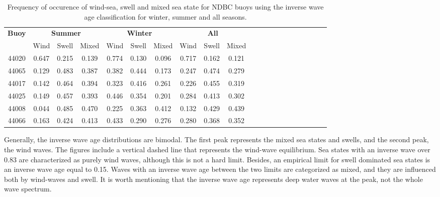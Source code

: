 \begin{table}[H]
\begin{tabular*}{0.94\textwidth}{c@{\hskip 0.35in}cccccccccc @{\extracolsep{\fill}} cccccccccc}
\toprule
  \multirow{2}{0.4in}{\textbf{Buoy}} & \multicolumn{3}{c}{\textbf{Summer}} & \multicolumn{3}{c}{\textbf{Winter}} & \multicolumn{3}{c}{\textbf{All}} \\ 
    ~    & Wind   & Swell & Mixed & Wind   & Swell & Mixed & Wind & Swell & Mixed \\ \midrule
 44020 &        0.647 &         0.215 &         0.139 &        0.774 &         0.130 &         0.096 &  0.717 &  0.162 &  0.121 \\
 44065 &        0.129 &         0.483 &         0.387 &        0.382 &         0.444 &         0.173 &  0.247 &  0.474 &  0.279 \\
 44017 &        0.142 &         0.464 &         0.394 &        0.323 &         0.416 &         0.261 &  0.226 &  0.455 &  0.319 \\
 44025 &        0.149 &         0.457 &         0.393 &        0.446 &         0.354 &         0.201 &  0.284 &  0.413 &  0.302 \\
 44008 &        0.044 &         0.485 &         0.470 &        0.225 &         0.363 &         0.412 &  0.132 &  0.429 &  0.439 \\
 44066 &        0.163 &         0.424 &         0.413 &        0.433 &         0.290 &         0.276 &  0.280 &  0.368 &  0.352 \\ \bottomrule
\end{tabular*}
\caption {Frequency of occurence of wind-sea, swell and mixed sea state for NDBC buoys using the inverse wave age classification for winter, summer and all seasons.}
\label{waveage_distribution}
\end{table}


Generally, the inverse wave age distributions are bimodal. The first peak represents the mixed sea states and swells, and the second peak, the wind waves. The figures include a vertical dashed line that represents the wind-wave equilibrium. Sea states with an inverse wave over 0.83 are characterized as purely wind waves, although this is not a hard limit. Besides, an empirical limit for swell dominated sea states is an inverse wave age equal to 0.15. Waves with an inverse wave age between the two limits are categorized as mixed, and they are influenced both by wind-waves and swell. It is worth mentioning that the inverse wave age represents deep water waves at the peak, not the whole wave spectrum.


